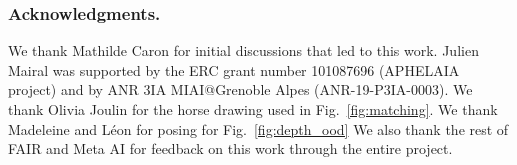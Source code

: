 \documentclass[10pt]{article}
\begin{document}
\subsubsection*{Acknowledgments.}
We thank Mathilde Caron for initial discussions that led to this work. 
Julien Mairal was supported by the ERC grant number 101087696 (APHELAIA project) and by ANR 3IA MIAI@Grenoble Alpes (ANR-19-P3IA-0003).
We thank Olivia Joulin for the horse drawing used in Fig.~\ref{fig:matching}.
We thank Madeleine and Léon for posing for Fig.~\ref{fig:depth_ood}
We also thank the rest of FAIR and Meta AI for feedback on this work through the entire project.




\clearpage
\appendix



\end{document}
